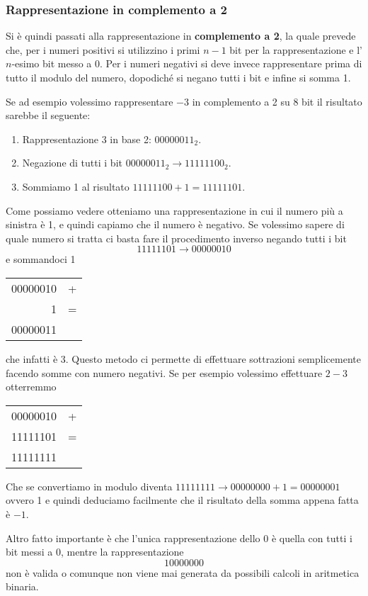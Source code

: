 \subsubsection{Rappresentazione in complemento a 2}
Si è quindi passati alla rappresentazione in \textbf{complemento a 2}, la quale prevede che, per i
numeri positivi si utilizzino i primi $n-1$ bit per la rappresentazione e l'$n$-esimo bit messo a 0.
Per i numeri negativi si deve invece rappresentare prima di tutto il modulo del numero, dopodiché
si negano tutti i bit e infine si somma 1.

Se ad esempio volessimo rappresentare $-3$ in complemento a 2 su 8 bit il risultato sarebbe il
seguente:
\begin{enumerate}
	\item Rappresentazione 3 in base 2: $00000011_2$.
	\item Negazione di tutti i bit $00000011_2 \to 11111100_2$.
	\item Sommiamo 1 al risultato $11111100 + 1 = 11111101$.
\end{enumerate}
Come possiamo vedere otteniamo una rappresentazione in cui il numero più a sinistra è 1, e quindi
capiamo che il numero è negativo. Se volessimo sapere di quale numero si tratta ci basta fare il
procedimento inverso negando tutti i bit
\[ 11111101 \to 00000010 \]
e sommandoci 1
\begin{center}
	\begin{tabular}{r c}
		00000010 & + \\
		1        & = \\ \hline
		00000011
	\end{tabular}
\end{center}
che infatti è 3. Questo metodo ci permette di effettuare sottrazioni semplicemente facendo somme
con numero negativi. Se per esempio volessimo effettuare $2 - 3$ otterremmo
\begin{center}
	\begin{tabular}{r c}
		00000010 & + \\
		11111101 & = \\ \hline
		11111111
	\end{tabular}
\end{center}
Che se convertiamo in modulo diventa $11111111 \to 00000000 + 1 = 00000001$ ovvero 1 e quindi
deduciamo facilmente che il risultato della somma appena fatta è $-1$.

Altro fatto importante è che l'unica rappresentazione dello 0 è quella con tutti i bit messi a 0,
mentre la rappresentazione
\[ 10000000 \]
non è valida o comunque non viene mai generata da possibili calcoli in aritmetica binaria.

